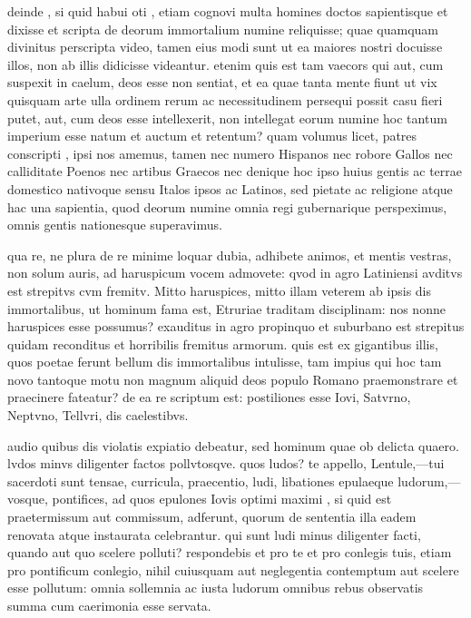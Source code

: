  deinde , si quid habui oti , etiam cognovi multa homines doctos sapientisque et dixisse et scripta de deorum immortalium numine reliquisse; quae quamquam divinitus perscripta video, tamen eius modi sunt ut ea maiores nostri docuisse illos, non ab illis didicisse videantur. etenim quis est tam vaecors qui aut, cum suspexit in caelum, deos esse non sentiat, et ea quae tanta mente fiunt ut vix quisquam arte ulla ordinem rerum ac necessitudinem persequi possit casu fieri putet, aut, cum deos esse intellexerit, non intellegat eorum numine hoc tantum imperium esse natum et auctum et retentum? quam volumus licet, patres conscripti , ipsi nos amemus, tamen nec numero Hispanos nec robore Gallos nec calliditate Poenos nec artibus Graecos nec denique hoc ipso huius gentis ac terrae domestico nativoque sensu Italos ipsos ac Latinos, sed pietate ac religione atque hac una sapientia, quod deorum numine omnia regi gubernarique perspeximus, omnis gentis nationesque superavimus.

 qua re, ne plura de re minime loquar dubia, adhibete animos, et mentis vestras, non solum auris, ad haruspicum vocem admovete: qvod in agro Latiniensi avditvs est strepitvs cvm fremitv. Mitto haruspices, mitto illam veterem ab ipsis dis immortalibus, ut hominum fama est, Etruriae traditam disciplinam: nos nonne haruspices esse possumus? exauditus in agro propinquo et suburbano est strepitus quidam reconditus et horribilis fremitus armorum. quis est ex gigantibus illis, quos poetae ferunt bellum dis immortalibus intulisse, tam impius qui hoc tam novo tantoque motu non magnum aliquid deos populo Romano praemonstrare et praecinere fateatur? de ea re scriptum est: postiliones esse Iovi, Satvrno, Neptvno, Tellvri, dis caelestibvs.

 audio quibus dis violatis expiatio debeatur, sed hominum quae ob delicta quaero. lvdos minvs diligenter factos pollvtosqve. quos ludos? te appello, Lentule,—tui sacerdoti sunt tensae, curricula, praecentio, ludi, libationes epulaeque ludorum,—vosque, pontifices, ad quos epulones Iovis optimi maximi , si quid est praetermissum aut commissum, adferunt, quorum de sententia illa eadem renovata atque instaurata celebrantur. qui sunt ludi minus diligenter facti, quando aut quo scelere polluti? respondebis et pro te et pro conlegis tuis, etiam pro pontificum conlegio, nihil cuiusquam aut neglegentia contemptum aut scelere esse pollutum: omnia sollemnia ac iusta ludorum omnibus rebus observatis summa cum caerimonia esse servata.

